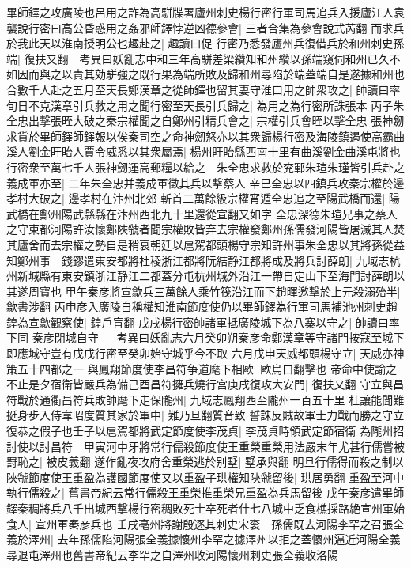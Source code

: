畢師鐸之攻廣陵也呂用之詐為高駢牒署廬州刺史楊行密行軍司馬追兵入援廬江人袁襲說行密曰高公昏惑用之姦邪師鐸悖逆凶德參會|{
	三者合集為參會說式芮翻}
而求兵於我此天以淮南授明公也趣赴之|{
	趣讀曰促}
行密乃悉發廬州兵復借兵於和州刺史孫端|{
	復扶又翻　考異曰妖亂志中和三年高駢差梁纘知和州纘以孫端窺伺和州已久不如因而與之以責其効駢強之既行果為端所敗及歸和州尋陷於端蓋端自是遂據和州也}
合數千人赴之五月至天長鄭漢章之從師鐸也留其妻守淮口用之帥衆攻之|{
	帥讀曰率}
旬日不克漢章引兵救之用之聞行密至天長引兵歸之|{
	為用之為行密所誅張本}
丙子朱全忠出撃張晊大破之秦宗權聞之自鄭州引精兵會之|{
	宗權引兵會晊以撃全忠}
張神劒求貨於畢師鐸師鐸報以俟秦司空之命神劒怒亦以其衆歸楊行密及海陵鎮遏使高霸曲溪人劉金盱眙人賈令威悉以其衆屬焉|{
	楊州盱眙縣西南十里有曲溪劉金曲溪屯將也}
行密衆至萬七千人張神劒運高郵糧以給之　朱全忠求救於兖鄆朱瑄朱瑾皆引兵赴之義成軍亦至|{
	二年朱全忠并義成軍徵其兵以撃蔡人}
辛巳全忠以四鎮兵攻秦宗權於邊孝村大破之|{
	邊孝村在汴州北郊}
斬首二萬餘級宗權宵遁全忠追之至陽武橋而還|{
	陽武橋在鄭州陽武縣縣在汴州西北九十里還從宣翻又如字}
全忠深德朱瑄兄事之蔡人之守東都河陽許汝懷鄭陜虢者聞宗權敗皆弃去宗權發鄭州孫儒發河陽皆屠滅其人焚其廬舍而去宗權之勢自是稍衰朝廷以扈駕都頭楊守宗知許州事朱全忠以其將孫從益知鄭州事　錢鏐遣東安都將杜稜浙江都將阮結静江都將成及將兵討薛朗|{
	九域志杭州新城縣有東安鎮浙江静江二都蓋分屯杭州城外沿江一帶自定山下至海門討薛朗以其遂周寶也}
甲午秦彦將宣歙兵三萬餘人乘竹筏沿江而下趙暉邀撃於上元殺溺殆半|{
	歙書涉翻}
丙申彦入廣陵自稱權知淮南節度使仍以畢師鐸為行軍司馬補池州刺史趙鍠為宣歙觀察使|{
	鍠戶肓翻}
戊戌楊行密帥諸軍抵廣陵城下為八寨以守之|{
	帥讀曰率下同}
秦彦閉城自守　|{
	考異曰妖亂志六月癸卯朔秦彦命鄭漢章等守諸門按寇至城下即應城守豈有戊戌行密至癸卯始守城乎今不取}
六月戊申天威都頭楊守立|{
	天威亦神策五十四都之一}
與鳳翔節度使李昌符争道麾下相歐|{
	歐烏口翻擊也}
帝命中使諭之不止是夕宿衛皆嚴兵為備己酉昌符擁兵燒行宫庚戌復攻大安門|{
	復扶又翻}
守立與昌符戰於通衢昌符兵敗帥麾下走保隴州|{
	九域志鳳翔西至隴州一百五十里}
杜讓能聞難挺身步入侍韋昭度質其家於軍中|{
	難乃旦翻質音致}
誓誅反賊故軍士力戰而勝之守立復恭之假子也壬子以扈駕都將武定節度使李茂貞|{
	李茂貞時領武定節宿衛}
為隴州招討使以討昌符　甲寅河中牙將常行儒殺節度使王重榮重榮用法嚴末年尤甚行儒嘗被罸恥之|{
	被皮義翻}
遂作亂夜攻府舍重榮逃於别墅|{
	墅承與翻}
明旦行儒得而殺之制以陜虢節度使王重盈為護國節度使又以重盈子珙權知陜虢留後|{
	珙居勇翻}
重盈至河中執行儒殺之|{
	舊書帝紀云常行儒殺王重榮推重榮兄重盈為兵馬留後}
戊午秦彦遣畢師鐸秦稠將兵八千出城西撃楊行密稠敗死士卒死者什七八城中乏食樵採路絶宣州軍始食人|{
	宣州軍秦彦兵也}
壬戌亳州將謝殷逐其刺史宋衮　孫儒既去河陽李罕之召張全義於澤州|{
	去年孫儒陷河陽張全義據懷州李罕之據澤州以拒之蓋懷州逼近河陽全義尋退屯澤州也舊書帝紀云李罕之自澤州收河陽懷州刺史張全義收洛陽}
